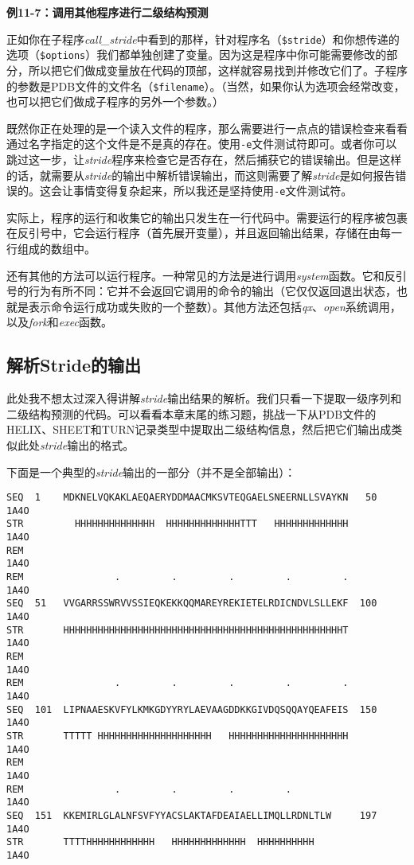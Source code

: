 \textbf{例11-7：调用其他程序进行二级结构预测}


正如你在子程序\textit{call\_stride}中看到的那样，针对程序名（\verb|$stride|）和你想传递的选项（\verb|$options|）我们都单独创建了变量。因为这是程序中你可能需要修改的部分，所以把它们做成变量放在代码的顶部，这样就容易找到并修改它们了。子程序的参数是PDB文件的文件名（\verb|$filename|）。（当然，如果你认为选项会经常改变，也可以把它们做成子程序的另外一个参数。）

既然你正在处理的是一个读入文件的程序，那么需要进行一点点的错误检查来看看通过名字指定的这个文件是不是真的存在。使用\verb|-e|文件测试符即可。或者你可以跳过这一步，让\textit{stride}程序来检查它是否存在，然后捕获它的错误输出。但是这样的话，就需要从\textit{stride}的输出中解析错误输出，而这则需要了解\textit{stride}是如何报告错误的。这会让事情变得复杂起来，所以我还是坚持使用\verb|-e|文件测试符。

实际上，程序的运行和收集它的输出只发生在一行代码中。需要运行的程序被包裹在反引号中，它会运行程序（首先展开变量），并且返回输出结果，存储在由每一行组成的数组中。

还有其他的方法可以运行程序。一种常见的方法是进行调用\textit{system}函数。它和反引号的行为有所不同：它并不会返回它调用的命令的输出（它仅仅返回退出状态，也就是表示命令运行成功或失败的一个整数）。其他方法还包括\textit{qx}、\textit{open}系统调用，以及\textit{fork}和\textit{exec}函数。

\subsection{解析Stride的输出}
此处我不想太过深入得讲解\textit{stride}输出结果的解析。我们只看一下提取一级序列和二级结构预测的代码。可以看看本章末尾的练习题，挑战一下从PDB文件的HELIX、SHEET和TURN记录类型中提取出二级结构信息，然后把它们输出成类似此处\textit{stride}输出的格式。

下面是一个典型的\textit{stride}输出的一部分（并不是全部输出）：

\begin{lstlisting}
SEQ  1    MDKNELVQKAKLAEQAERYDDMAACMKSVTEQGAELSNEERNLLSVAYKN   50          1A4O
STR         HHHHHHHHHHHHHH  HHHHHHHHHHHHHTTT   HHHHHHHHHHHHH               1A4O
REM                                                                        1A4O
REM                .         .         .         .         .               1A4O
SEQ  51   VVGARRSSWRVVSSIEQKEKKQQMAREYREKIETELRDICNDVLSLLEKF  100          1A4O
STR       HHHHHHHHHHHHHHHHHHHHHHHHHHHHHHHHHHHHHHHHHHHHHHHHHT               1A4O
REM                                                                        1A4O
REM                .         .         .         .         .               1A4O
SEQ  101  LIPNAAESKVFYLKMKGDYYRYLAEVAAGDDKKGIVDQSQQAYQEAFEIS  150          1A4O
STR       TTTTT HHHHHHHHHHHHHHHHHHHH   HHHHHHHHHHHHHHHHHHHHH               1A4O
REM                                                                        1A4O
REM                .         .         .         .                         1A4O
SEQ  151  KKEMIRLGLALNFSVFYYACSLAKTAFDEAIAELLIMQLLRDNLTLW     197          1A4O
STR       TTTTHHHHHHHHHHHH   HHHHHHHHHHHHH  HHHHHHHHHH                     1A4O
\end{lstlisting}

